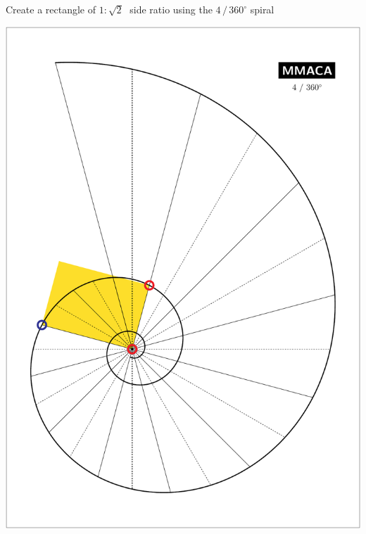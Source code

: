 \documentclass[a4paper,12pt]{article}
\begin{document}
    \begin{center}
    
        \large

        Create a rectangle of $1\!:\!\sqrt{2}\;$ side ratio using the $4 \, / \, 360^{\circ}$ spiral

        \bigskip \bigskip \bigskip
    
        \includegraphics[scale=0.7071]{./pictures/Example_05}

    \end{center}

    \newpage

\end{document}
